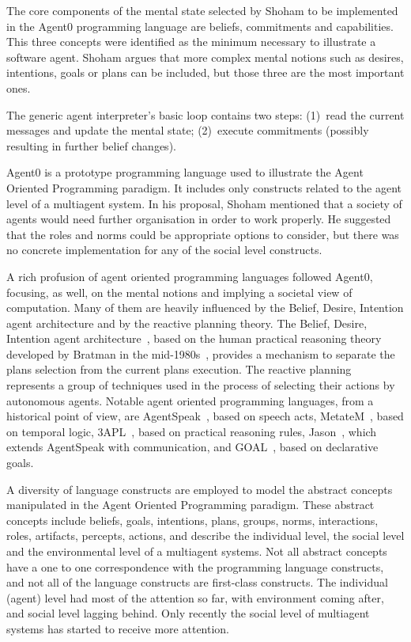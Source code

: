 \documentclass[a4paper,12pt,oneside,fleqn]{book} %
\begin{document}
The core components of the mental state selected by Shoham to be
implemented in the Agent0 programming language are beliefs, commitments and
capabilities. This three concepts were identified as the minimum necessary
to illustrate a software agent. Shoham argues that more complex mental
notions such as desires, intentions, goals or plans can be included, but
those three are the most important ones.

The generic agent interpreter's basic loop contains two steps: (1)~read
the current messages and update the mental state; (2)~execute commitments
(possibly resulting in further belief changes).

Agent0 is a prototype programming language used to illustrate the Agent
Oriented Programming paradigm. It includes only constructs related to the
agent level of a multiagent system. In his proposal, Shoham mentioned that
a society of agents would need further organisation in order to work
properly. He suggested that the roles and norms could be appropriate
options to consider, but there was no concrete implementation for any of
the social level constructs.

A rich profusion of agent oriented programming languages followed Agent0,
focusing, as well, on the mental notions and implying a societal view of
computation.  Many of them are heavily influenced by the Belief, Desire,
Intention agent architecture and by the reactive planning theory.  The
Belief, Desire, Intention agent architecture~\cite{DBLP:conf/icmas/RaoG95},
based on the human practical reasoning theory developed by Bratman in the
mid-1980s~\cite{Bratman:1999}, provides a mechanism to separate the plans
selection from the current plans execution.  The reactive
planning~\cite{DBLP:conf/aaai/GeorgeffL87} represents a group of techniques
used in the process of selecting their actions by autonomous agents.
Notable agent oriented programming languages, from a historical point of
view, are AgentSpeak~\cite{DBLP:conf/maamaw/Rao96}, based on speech acts,
MetateM~\cite{DBLP:conf/promas/Fisher05}, based on temporal logic,
3APL~\cite{DBLP:conf/promas/DastaniRDM03}, based on practical reasoning
rules, Jason~\cite{DBLP:books/sp/map2005/BordiniHV05}, which extends
AgentSpeak with communication, and
GOAL~\cite{DBLP:journals/corr/cs-AI-0207008}, based on declarative goals.

A diversity of language constructs are employed to model the abstract
concepts manipulated in the Agent Oriented Programming paradigm. These
abstract concepts include beliefs, goals, intentions, plans, groups, norms,
interactions, roles, artifacts, percepts, actions, and describe the
individual level, the social level and the environmental level of a
multiagent systems. Not all abstract concepts have a one to one
correspondence with the programming language constructs, and not all of the
language constructs are first-class constructs. The individual (agent) level
had most of the attention so far, with environment coming after, and social
level lagging behind. Only recently the social level of multiagent systems
has started to receive more attention.
\end{document}
